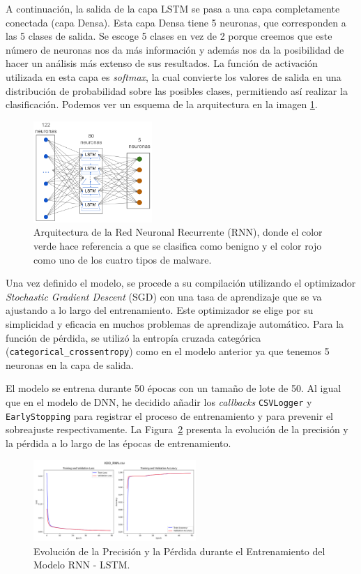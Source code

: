 A continuación, la salida de la capa LSTM se pasa a una capa completamente conectada (capa Densa). Esta capa Densa tiene 5 neuronas, que corresponden a las 5 clases de salida. Se escoge 5 clases en vez de 2 porque creemos que este número de neuronas nos da más información y además nos da la posibilidad de hacer un análisis más extenso de sus resultados. La función de activación utilizada en esta capa es \textit{softmax}, la cual convierte los valores de salida en una distribución de probabilidad sobre las posibles clases, permitiendo así realizar la clasificación. Podemos ver un esquema de la arquitectura en la imagen \ref{fig:kddRNN}.

\begin{figure}[h]
    \centering
    \includegraphics[width=0.4\textwidth]{img/kddRNN.png}
    \caption{Arquitectura de la Red Neuronal Recurrente (RNN), donde el color verde hace referencia a que se clasifica como benigno y el color rojo como uno de los cuatro tipos de malware.}
    \label{fig:kddRNN}
\end{figure}

Una vez definido el modelo, se procede a su compilación utilizando el optimizador \textit{Stochastic Gradient Descent} (SGD) con una tasa de aprendizaje que se va ajustando a lo largo del entrenamiento. Este optimizador se elige por su simplicidad y eficacia en muchos problemas de aprendizaje automático. Para la función de pérdida, se utilizó la entropía cruzada categórica (\lstinline|categorical_crossentropy|) como en el modelo anterior ya que tenemos 5 neuronas en la capa de salida.

El modelo se entrena durante 50 épocas con un tamaño de lote de 50. Al igual que en el modelo de DNN, he decidido añadir los \textit{callbacks} \lstinline|CSVLogger| y \lstinline|EarlyStopping| para registrar el proceso de entrenamiento y para prevenir el sobreajuste respectivamente. La Figura~\ref{fig:kdd_rnn} presenta la evolución de la precisión y la pérdida a lo largo de las épocas de entrenamiento.

\begin{figure}[h]
    \centering
    \includegraphics[width=0.55\textwidth]{img/KDD_RNN.csv.png}
    \caption{Evolución de la Precisión y la Pérdida durante el Entrenamiento del Modelo RNN - LSTM.}
    \label{fig:kdd_rnn}
\end{figure}

